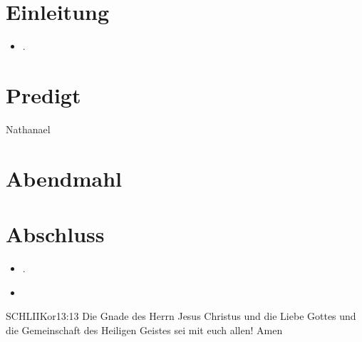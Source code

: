 \documentclass[fontsize=14pt]{mybib}
\newcommand{\Name}{Nathanael}
\begin{document}
\section{Einleitung}


\begin{itemize}
    \item {}.
\end{itemize}
\section{Predigt}
\Name
\section{Abendmahl}
\section{Abschluss}
\begin{itemize}
    \item {}.
    \item {}
\end{itemize}
\begin{bibelbox}{SCHL}{IIKor}{13:13}
    Die Gnade des Herrn Jesus Christus und die Liebe Gottes und die Gemeinschaft des Heiligen Geistes sei mit euch allen! Amen
\end{bibelbox}
\end{document}
